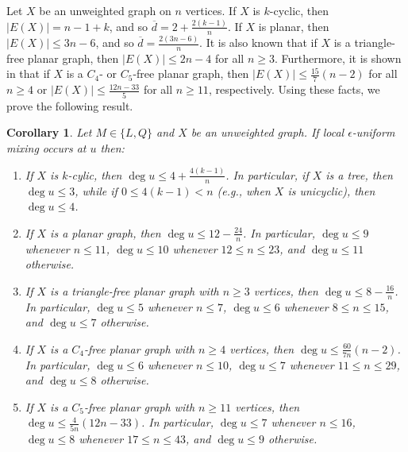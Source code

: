 \documentclass[11pt]{article}
\newtheorem{corollary}{Corollary}
\begin{document}
Let $X$ be an unweighted graph on $n$ vertices. If $X$ is
$k$-cyclic, then $|E(X)|=n-1+k$, and so $\overline{d}=2+\frac{2(k-1)}{n}$. If $X$ is planar, then $|E(X)|\leq 3n-6$, and so $\overline{d}=\frac{2(3n-6)}{n}$. It is also known that if $X$ is a triangle-free planar graph, then $|E(X)|\leq 2n-4$ for all $n\geq 3$. Furthermore, it is shown in \cite{dowden2016extremal} that if $X$ is a $C_4$- or $C_5$-free planar graph, then $|E(X)|\leq \frac{15}{7}(n-2)$ for all $n\geq 4$ or $|E(X)|\leq \frac{12n-33}{5}$ for all $n\geq 11$, respectively. Using these facts, we prove the following result.

\begin{corollary}
\label{Cor:tree}
Let $M\in\{L,Q\}$ and $X$ be an unweighted graph.\hspace{-0.02in} If local $\epsilon$-uniform mixing occurs at $u$ then:
\begin{enumerate}
\item If $X$ is $k$-cylic, then $\operatorname{deg}u\leq 4+\frac{4(k-1)}{n}$. In particular, if $X$ is a tree, then $\operatorname{deg}u\leq 3$, while if $0\leq 4(k-1)<n$ (e.g., when $X$ is unicyclic), then $\operatorname{deg}u\leq 4$.
\item If $X$ is a planar graph, then $\operatorname{deg}u\leq 12-\frac{24}{n}$. In particular, $\operatorname{deg}u\leq 9$ whenever $n\leq 11$, $\operatorname{deg}u\leq 10$ whenever $12\leq n\leq 23$, and $\operatorname{deg}u\leq 11$ otherwise. 
\item If $X$ is a triangle-free planar graph with $n\geq 3$ vertices, then $\operatorname{deg}u\leq 8-\frac{16}{n}$. In particular, $\operatorname{deg}u\leq 5$ whenever $n\leq 7$, $\operatorname{deg}u\leq 6$ whenever $8\leq n\leq 15$, and $\operatorname{deg}u\leq 7$ otherwise.
\item If $X$ is a $C_4$-free planar graph  with $n\geq 4$ vertices, then $\operatorname{deg}u\leq \frac{60}{7n}(n-2)$. In particular, $\operatorname{deg}u\leq 6$ whenever $ n\leq 10$, $\operatorname{deg}u\leq 7$ whenever $11\leq n\leq 29$, and $\operatorname{deg}u\leq 8$ otherwise.
\item If $X$ is a $C_5$-free planar graph with $n\geq 11$ vertices, then $\operatorname{deg}u\leq \frac{4}{5n}(12n-33)$. In particular, $\operatorname{deg}u\leq 7$ whenever $n\leq 16$, $\operatorname{deg}u\leq 8$ whenever $17\leq n\leq 43$, and $\operatorname{deg}u\leq 9$ otherwise.
\end{enumerate}
\end{corollary}
\end{document}
